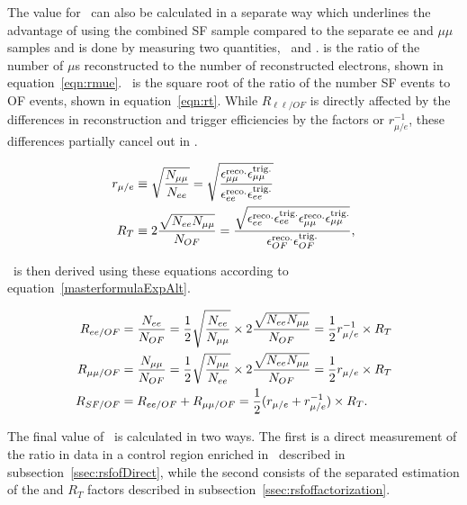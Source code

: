 The value for \rsfof\ can also be calculated in a separate way which underlines
the advantage of using the combined SF sample compared to the separate ee and $\mu\mu$ samples
and is done by measuring two quantities, \rmue\ and \rt.
\rmue is the ratio of the number of $\mu$s reconstructed to the number of reconstructed electrons, shown in equation~\ref{eqn:rmue}.
\rt\ is the square root of the ratio of the number SF events to OF events, shown in equation~\ref{eqn:rt}.
While $R_{\ell\ell/OF}$ is directly affected by the differences in reconstruction and trigger efficiencies by the factors \rmue 
or $r_{\mu/e}^{-1}$, these differences partially cancel out in \rsfof.

\begin{align}
  \label{eqn:rmue} r_{\mu/e} & \equiv \sqrt{\frac{N_{\mu\mu}}{N_{\relax{e}\relax{e}}}} 
  = \sqrt{\frac{\epsilon_{\mu\mu}^\mathrm{reco.}\epsilon_{\mu\mu}^\mathrm{trig.}}{\epsilon_{\relax{e}\relax{e}}^\mathrm{reco.}\epsilon_{\relax{e}\relax{e}}^\mathrm{trig.}}} \\
  \label{eqn:rt} R_T   & \equiv 2 \frac{\sqrt{N_{\relax{e}\relax{e}}N_{\mu\mu}}}{N_{OF}} 
  = \frac{\sqrt{\epsilon_{\relax{e}\relax{e}}^\mathrm{reco.}\epsilon_{\relax{e}\relax{e}}^\mathrm{trig.}\epsilon_{\mu\mu}^\mathrm{reco.}\epsilon_{\mu\mu}^\mathrm{trig.}}}{\epsilon_{OF}^\mathrm{reco.}\epsilon_{OF}^\mathrm{trig.}},
\end{align}

\rsfof\ is then derived using these equations according to equation~\ref{masterformulaExpAlt}.

\begin{align}
  \label{masterformulaExpAlt}
  R_{\relax{e}\relax{e}/OF} & = \frac{N_{\relax{e}\relax{e}}}{N_{OF}} 
  = \frac{1}{2} \sqrt{\frac{N_{\relax{e}\relax{e}}}{N_{\mu\mu}}} \times 2 \frac{\sqrt{N_{\relax{e}\relax{e}}N_{\mu\mu}}}{N_{OF}} = \frac{1}{2} r_{\mu/e}^{-1} \times R_T \notag \\
  R_{\mu\mu/OF} & = \frac{N_{\mu\mu}}{N_{OF}} 
  = \frac{1}{2} \sqrt{\frac{N_{\mu\mu}}{N_{\relax{e}\relax{e}}}} \times 2 \frac{\sqrt{N_{\relax{e}\relax{e}}N_{\mu\mu}}}{N_{OF}} = \frac{1}{2} r_{\mu/e} \times R_T \notag\\
  R_{SF/OF} & = R_{\relax{e}\relax{e}/OF}+R_{\mu\mu/OF} = \frac{1}{2} (r_{\mu/e} + r_{\mu/e}^{-1})\times R_T. 
\end{align}

The final value of \rsfof\ is calculated in two ways.
The first is a direct measurement of the ratio in data in a control region enriched in \ttbar\ described in subsection~\ref{ssec:rsfofDirect},
while the second consists of the separated estimation of the \rmue and $R_T$ factors described in subsection~\ref{ssec:rsfoffactorization}.

